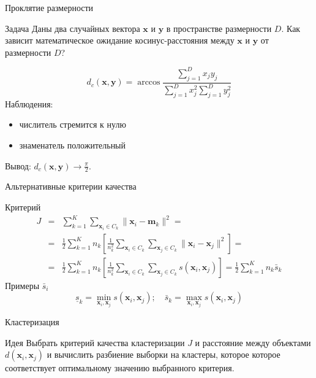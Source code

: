 \documentclass[10pt]{beamer}
\begin{document}
\begin{frame}{Проклятие размерности}

\begin{block}{Задача}
Даны два случайных вектора $\mathbf{x}$ и $\mathbf{y}$ в пространстве размерности $D$. Как зависит математическое ожидание косинус-расстояния между $\mathbf{x}$ и $\mathbf{y}$ от размерности $D$?
\end{block}

\[
d_c(\mathbf{x}, \mathbf{y}) = \arccos \frac{\sum_{j=1}^D x_j y_j}{\sum_{j=1}^D x_j^2 \sum_{j=1}^D y_j^2}
\]
Наблюдения:
\begin{itemize}
\item числитель стремится к нулю
\item знаменатель положительный
\end{itemize}
Вывод: $d_c(\mathbf{x}, \mathbf{y}) \rightarrow \frac \pi 2$.

\end{frame}

\begin{frame}{Альтернативные критерии качества}

Критерий
\begin{eqnarray*}
J &=& \sum_{k=1}^K \sum_{\mathbf{x}_i \in C_k} \| \mathbf{x}_i - \mathbf{m}_k \|^2 = \\
&=& \frac 1 2 \sum_{k=1}^K n_k \left[ \frac{1}{n_k^2} \sum_{\mathbf{x}_i \in C_k} \sum_{\mathbf{x}_j \in C_k} \| \mathbf{x}_i - \mathbf{x}_j \|^2 \right] = \\
&=& \frac 1 2 \sum_{k=1}^K n_k \left[ \frac{1}{n_k^2} \sum_{\mathbf{x}_i \in C_k} \sum_{\mathbf{x}_j \in C_k} s(\mathbf{x}_i, \mathbf{x}_j) \right] = \frac 1 2 \sum_{k=1}^K n_k \bar s_k
\end{eqnarray*}
Примеры $\bar s_i$
\[
\underline{s}_k = \min_{\mathbf{x}_i, \mathbf{x}_j} s(\mathbf{x}_i, \mathbf{x}_j); \quad \bar s_k = \max_{\mathbf{x}_i, \mathbf{x}_j} s(\mathbf{x}_i, \mathbf{x}_j)\]

\end{frame}

\begin{frame}{Кластеризация}

\begin{block}{Идея}
Выбрать критерий качества кластеризации $J$ и расстояние между объектами $d(\mathbf{x}_i, \mathbf{x}_j)$ и вычислить разбиение выборки на кластеры, которое которое соответствует оптимальному значению выбранного критерия.
\end{block}

\end{frame}
\end{document}
